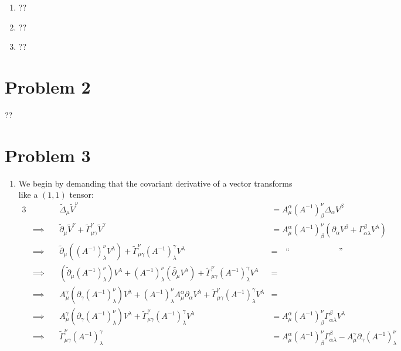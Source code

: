 \documentclass[12pt]{article}
\newcommand{\chrissym}[3]{\Gamma_{#2#3}^#1}
\newcommand{\tchrissym}[3]{\tilde{\Gamma}_{#2#3}^#1}
\begin{document}
\begin{enumerate}[label=(\alph*)]
    \item ??

    \item ??

    \item ??
\end{enumerate}

\section*{Problem 2}
??

\section*{Problem 3}
\begin{enumerate}[label=(\alph*)]
    \item We begin by demanding that the covariant derivative of a vector transforms like a $(1,1)$ tensor:
    \begin{alignat*}{3}
        &         \quad & \tilde{\Delta}_\mu\tilde{V}^\nu &= A_\mu^\alpha (A^{-1})_\beta^\nu\Delta_\alpha V^\beta \\
        &\implies \quad & \tilde{\partial}_\mu\tilde{V}^\nu + \tchrissym{\nu}{\mu}{\gamma}\tilde{V}^\gamma &= A_\mu^\alpha (A^{-1})_\beta^\nu\left(\partial_\alpha V^\beta + \chrissym{\beta}{\alpha}{\lambda}V^\lambda\right) \\
        &\implies \quad & \tilde{\partial}_\mu\left((A^{-1})_\lambda^\nu V^\lambda\right) + \tchrissym{\nu}{\mu}{\gamma}(A^{-1})_\lambda^\gamma V^\lambda &= \quad \text{``}\qquad\qquad\qquad\text{''}\quad\\
        &\implies \quad & (\tilde{\partial}_\mu (A^{-1})_\lambda^\nu) V^\lambda + (A^{-1})_\lambda^\nu (\tilde{\partial_\mu}V^\lambda) + \tchrissym{\nu}{\mu}{\gamma}(A^{-1})_\lambda^\gamma V^\lambda &= \\
        &\implies \quad & A_\mu^\gamma(\partial_\gamma(A^{-1})_\lambda^\nu)V^\lambda + (A^{-1})_\lambda^\nu A_\mu^\alpha\partial_\alpha V^\lambda + \tchrissym{\nu}{\mu}{\gamma}(A^{-1})_\lambda^\gamma V^\lambda &= \\
        &\implies \quad & A_\mu^\gamma(\partial_\gamma(A^{-1})_\lambda^\nu)V^\lambda + \tchrissym{\nu}{\mu}{\gamma}(A^{-1})_\lambda^\gamma V^\lambda &= A_\mu^\alpha (A^{-1})_\beta^\nu\chrissym{\beta}{\alpha}{\lambda}V^\lambda \\
        &\implies \quad & \tchrissym{\nu}{\mu}{\gamma}(A^{-1})_\lambda^\gamma &= A_\mu^\alpha (A^{-1})_\beta^\nu\chrissym{\beta}{\alpha}{\lambda} - A_\mu^\gamma\partial_\gamma(A^{-1})_\lambda^\nu \\

\end{alignat*}
\end{enumerate}
\end{document}

